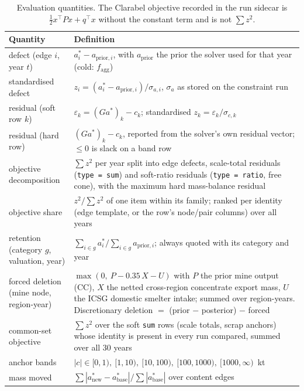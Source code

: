 \documentclass[11pt]{article}
\begin{document}
\begin{table}[h]
\centering\small
\begin{tabular}{@{}lp{9.6cm}@{}}
\toprule
Quantity & Definition \\
\midrule
defect (edge $i$, year $t$) & $a^*_i - a_{\mathrm{prior},i}$, with $a_{\mathrm{prior}}$ the prior the solver used for that year (cold: $f_{\mathrm{agg}}$) \\
standardised defect & $z_i = (a^*_i - a_{\mathrm{prior},i})/\sigma_{a,i}$, $\sigma_a$ as stored on the constraint run \\
residual (soft row $k$) & $\varepsilon_k = (G a^*)_k - c_k$; standardised $z_k = \varepsilon_k/\sigma_{c,k}$ \\
residual (hard row) & $(G a^*)_k - c_k$, reported from the solver's own residual vector; $\le 0$ is slack on a band row \\
objective decomposition & $\sum z^2$ per year split into edge defects, scale-total residuals (\texttt{type = sum}) and soft-ratio residuals (\texttt{type = ratio}, free cone), with the maximum hard mass-balance residual \\
objective share & $z^2 / \sum z^2$ of one item within its family; ranked per identity (edge template, or the row's node/pair columns) over all years \\
retention (category $g$, valuation, year) & $\sum_{i \in g} a^*_i / \sum_{i \in g} a_{\mathrm{prior},i}$; always quoted with its category and year \\
forced deletion (mine node, region-year) & $\max(0,\ P - 0.35\,X - U)$ with $P$ the prior mine output (CC), $X$ the netted cross-region concentrate export mass, $U$ the ICSG domestic smelter intake; summed over region-years. Discretionary deletion $=$ (prior $-$ posterior) $-$ forced \\
common-set objective & $\sum z^2$ over the soft \texttt{sum} rows (scale totals, scrap anchors) whose identity is present in every run compared, summed over all 30 years \\
anchor bands & $|c| \in [0,1),\ [1,10),\ [10,100),\ [100,1000),\ [1000,\infty)$~kt \\
mass moved & $\sum |a^*_{\mathrm{new}} - a^*_{\mathrm{base}}| / \sum |a^*_{\mathrm{base}}|$ over content edges \\
\bottomrule
\end{tabular}
\caption{Evaluation quantities. The Clarabel objective recorded in the run
sidecar is $\tfrac12 x^\top P x + q^\top x$ without the constant term and is
not $\sum z^2$.}
\label{tab:si-metrics}
\end{table}
\end{document}
